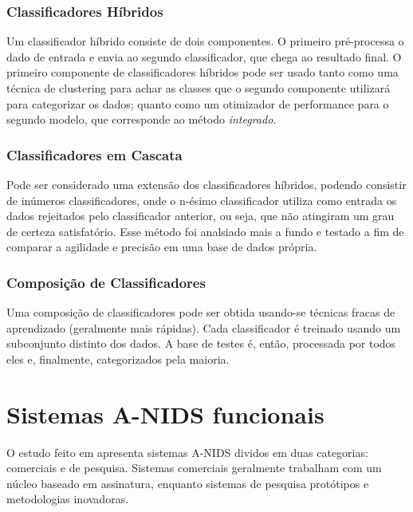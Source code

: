  \subsection{Classificadores Híbridos}
    Um classificador híbrido consiste de dois componentes. O primeiro pré-processa o dado de entrada e envia ao segundo
    classificador, que chega ao resultado final. O primeiro componente de classificadores híbridos pode ser usado tanto
    como uma técnica de clustering para achar as classes que o segundo componente utilizará para categorizar os dados;
    quanto como um otimizador de performance para o segundo modelo, que corresponde ao método \textit{integrado}.


 \subsection{Classificadores em Cascata}
    Pode ser considerado uma extensão dos classificadores híbridos, podendo consistir de inúmeros classificadores, onde
    o n-ésimo classificador utiliza como entrada os dados rejeitados pelo classificador anterior, ou seja, que não
    atingiram um grau de certeza satisfatório. Esse método foi analsiado mais a fundo e testado a fim de comparar
    a agilidade e precisão em uma base de dados própria.

 \subsection{Composição de Classificadores}
    Uma composição de classificadores pode ser obtida usando-se técnicas fracas de aprendizado
    (geralmente mais rápidas). Cada classificador é treinado usando um subconjunto distinto dos dados.
    A base de testes é, então, processada por todos eles e, finalmente, categorizados pela maioria.


\chapter{Sistemas A-NIDS funcionais}
    O estudo feito em \cite{teodoro09} apresenta sistemas A-NIDS dividos em duas categorias: comerciais e de pesquisa.
    Sistemas comerciais geralmente trabalham com um núcleo baseado em assinatura, enquanto sistemas de pesquisa
    protótipos e metodologias inovadoras.

